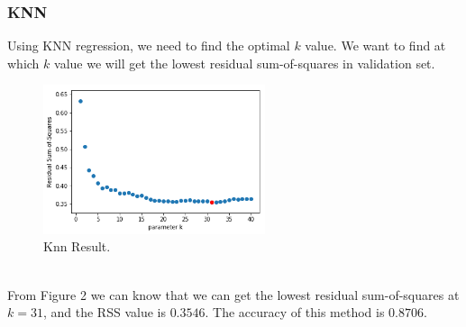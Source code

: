 \documentclass{article}
\begin{document}
\subsubsection{KNN}
Using KNN regression, we need to find the optimal $k$ value. We want to find at which $k$ value we will get the lowest residual sum-of-squares in validation set.
\begin{figure}[h]
	\centering
	\includegraphics[width=6.5cm]{knn.jpg}
	\caption{Knn Result.}
\end{figure}
\\From Figure 2 we can know that we can get the lowest residual sum-of-squares at $k=31$, and the RSS value is $0.3546$. The accuracy of this method is $0.8706$.
\end{document}
